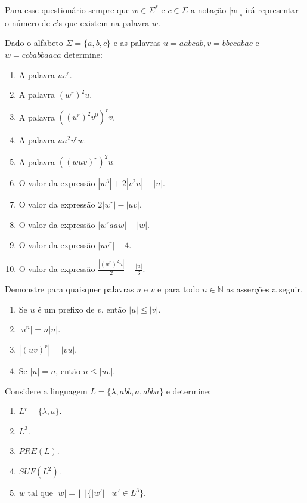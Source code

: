 \begin{rema}
	Para esse questionário sempre que $w \in \Sigma^*$ e $c \in \Sigma$ a notação $|w|_c$ irá representar o número de $c$'s que existem na palavra $w$.
\end{rema}

\begin{exercise}\label{exerc:LR1}
	Dado o alfabeto $\Sigma = \{a, b, c\}$ e as palavras $u = aabcab, v = bbccabac$ e $w = ccbabbaaca$ determine:
\end{exercise}

\begin{enumerate}
	\item A palavra $uv^r$.
	\item A palavra $(w^r)^2u$.
	\item A palavra $((u^r)^2v^0)^rv$.
	\item A palavra $uu^2v^rw$.
	\item A palavra $((wuv)^r)^2u$.
	\item O valor da expressão $|w^3| + 2|v^2u| - |u|$.
	\item O valor da expressão $2|w^r| - |uv|$.
	\item O valor da expressão $|w^raaw| - |w|$.
	\item O valor da expressão $|uv^r| - 4$.
	\item O valor da expressão $\frac{|(w^r)^2u|}{2} - \frac{|u|}{6}$.
\end{enumerate}

\begin{exercise}\label{exerc:LR2}
	Demonstre para quaisquer palavras $u$ e $v$ e para todo $n \in \mathbb{N}$ as asserções a seguir.
\end{exercise}

\begin{enumerate}
	\item Se $u$ é um prefixo de $v$, então $|u| \leq |v|$.
	\item $|u^n| = n|u|$.
	\item $|(uv)^r| = |vu|$.
	\item Se $|u| = n$, então $n \leq |uv|$.
\end{enumerate}

\begin{exercise}\label{exerc:LR3}
	Considere a linguagem $L = \{\lambda, abb, a, abba\}$ e determine:
\end{exercise}

\begin{enumerate}
	\item $L^r - \{\lambda, a\}$.
	\item $L^3$.
	\item $PRE(L)$.
	\item $SUF(L^2)$.
	\item $w$ tal que $|w| = \bigsqcup \{|w'| \mid w' \in L^3\}$.
\end{enumerate}

